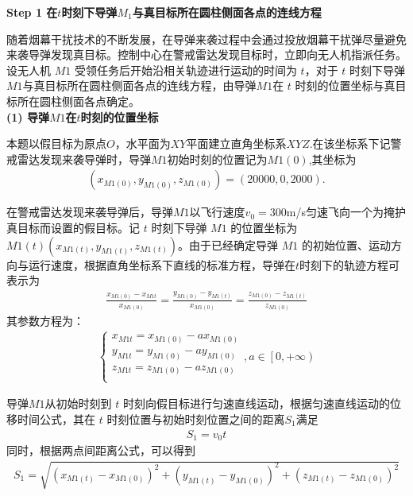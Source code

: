 \documentclass[../main.tex]{subfiles}
\begin{document}
\noindent \textbf{Step 1 在\( t \)时刻下导弹\( M_1 \)与真目标所在圆柱侧面各点的连线方程}
\par 随着烟幕干扰技术的不断发展，在导弹来袭过程中会通过投放烟幕干扰弹尽量避免来袭导弹发现真目标。控制中心在警戒雷达发现目标时，立即向无人机指派任务。设无人机 \( M1 \) 受领任务后开始沿相关轨迹进行运动的时间为 \( t \)，对于 \( t \) 时刻下导弹 \( M1 \)与真目标所在圆柱侧面各点的连线方程，由导弹$M1$在 \( t \) 时刻的位置坐标与真目标所在圆柱侧面各点确定。
\\
\textbf{(1) 导弹$M1$在\( t \)时刻的位置坐标}
\par 本题以假目标为原点$O$，水平面为$XY$平面建立直角坐标系$XYZ$.在该坐标系下记警戒雷达发现来袭导弹时，导弹$M1$初始时刻的位置记为$M1(0)$,其坐标为
\begin{align}
(x_{M1(0)}, y_{M1(0)}, z_{M1(0)})=(20000,0,2000).
\end{align}
\par 在警戒雷达发现来袭导弹后，导弹\( M1 \)以飞行速度$v_0 = 300$m/s匀速飞向一个为掩护真目标而设置的假目标。记 \( t \) 时刻下导弹 \( M1 \) 的位置坐标为 \( M1(t)(x_{M1(t)}, y_{M1(t)}, z_{M1(t)}) \)。由于已经确定导弹 \( M1 \) 的初始位置、运动方向与运行速度，根据直角坐标系下直线的标准方程，导弹在$t$时刻下的轨迹方程可表示为
\begin{align}\label{1.1}
\frac{x_{M1(0)}-x_{M1t}}{x_{M1(0)}}=\frac{y_{M1(0)}-y_{M1(t)}}{x_{M1(0)}}=\frac{z_{M1(0)}-z_{M1(t)}}{z_{M1(0)}}
\end{align}
其参数方程为：
\begin{align}\label{1.2}
\left\{ \begin{array}{l}
x_{M1t}=x_{M1(0)}-ax_{M1(0)}\\
y_{M1t}=y_{M1(0)}-ay_{M1(0)}\\
z_{M1t}=z_{M1(0)}-az_{M1(0)}\\
\end{array} \right. ,a\in \left[ 0,+\infty \right)
\end{align}
\par 导弹$M1$从初始时刻到 \( t \) 时刻向假目标进行匀速直线运动，根据匀速直线运动的位移时间公式，其在 $t$ 时刻位置与初始时刻位置之间的距离$S_1$满足
\begin{align}\label{1.5}
S_1 = v_0 t
\end{align}
同时，根据两点间距离公式，可以得到
\begin{align}\label{1.3}
S_1 =  \sqrt{(x_{M1(t)} - x_{M1(0)})^2 + (y_{M1(t)} - y_{M1(0)})^2 + (z_{M1(t)} - z_{M1(0)})^2}
\end{align}
\end{document}
